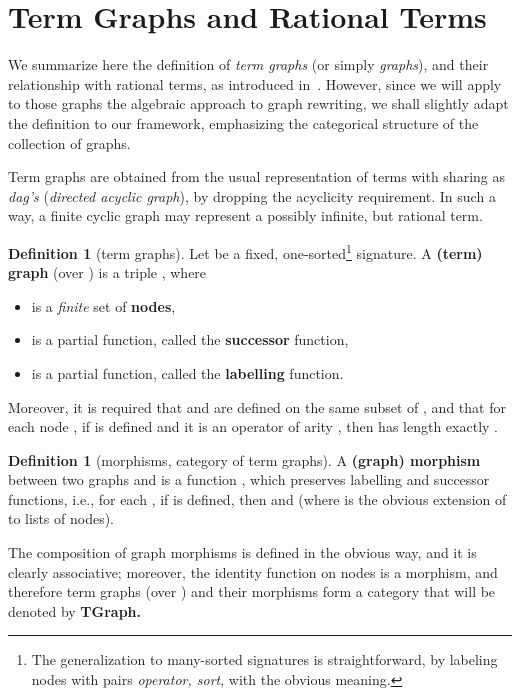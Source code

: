 \documentclass{eptcs}
\theoremstyle{plain}
\theoremstyle{definition}
\newtheorem{definition}[theorem]{Definition}
\begin{document}
\section{Term Graphs and Rational Terms}
\label{se:Term Graphs and Rational Terms}


We summarize here the definition of {\em term graphs} (or 
simply 
{\em graphs}), and their relationship with rational terms, as 
introduced 
in~\cite{KKSV:AGRS}. However, since we will apply to those graphs the 
algebraic approach to graph rewriting, we shall slightly adapt the 
definition to our framework, emphasizing the categorical 
structure of the collection of graphs.

Term graphs are obtained from the usual representation 
of terms with sharing as {\em dag's} ({\em directed acyclic graph}), by 
dropping the acyclicity requirement. In such a way, a finite cyclic 
graph 
may represent a possibly infinite, but rational term.


\begin{definition}
[term graphs]
\label{de:graphs}
Let  be a fixed, one-sorted\footnote{The 
generalization to many-sorted signatures is straightforward, by 
labeling nodes with pairs {\em operator, sort}, 
with the obvious meaning.} signature. A {\bf (term) graph} 
(over )
  is a triple , where
\begin{itemize}
\item	 is a {\em finite} set of {\bf nodes\/},
\item	 is a partial function, called the 
{\bf 
successor} function,
\item	 is a partial function, called the 
{\bf labelling} function.
\end{itemize}
\noindent
Moreover, it is required that  and  are defined on the same 
subset of , and that for each node , if  is 
defined and it is an operator of arity , then  has length 
exactly 
. \end{definition}


\begin{definition}
[morphisms, category of term graphs]
\label{de:morphisms}
A {\bf (graph) morphism}  between two 
graphs
 and  is a function , which preserves 
labelling and successor functions, i.e., for each , if 
 is defined, then  and  (where  is the obvious extension of  to lists of 
nodes).

The composition of graph morphisms is defined in the obvious way, and 
it 
is clearly associative; moreover, the identity function on nodes is a 
morphism, and therefore term graphs (over ) and their 
morphisms 
form a category that will be denoted by \bf{TGraph}.
\end{definition}
\end{document}
